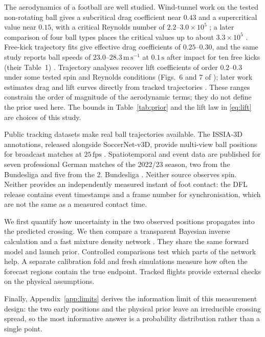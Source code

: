 \documentclass[11pt,a4paper]{article}
\begin{document}
The aerodynamics of a football are well studied. Wind-tunnel work on the tested non-rotating ball gives a subcritical drag coefficient near $0.43$ and a supercritical value near $0.15$, with a critical Reynolds number of $2.2$--$3.0\times10^5$ \cite{asai2007}; a later comparison of four ball types places the critical values up to about $3.3\times10^5$ \cite{asai2013}. Free-kick trajectory fits give effective drag coefficients of $0.25$--$0.30$, and the same study reports ball speeds of $23.0$--$28.3\,\mathrm{m\,s^{-1}}$ at $0.1\,\mathrm{s}$ after impact for ten free kicks (their Table~1) \cite{bray2003}. Trajectory analyses recover lift coefficients of order $0.2$--$0.3$ under some tested spin and Reynolds conditions (Figs.~6 and 7 of \cite{goff2010}); later work estimates drag and lift curves directly from tracked trajectories \cite{goff2017}. These ranges constrain the order of magnitude of the aerodynamic terms; they do not define the prior used here. The bounds in Table~\ref{tab:prior} and the lift law in \eqref{eq:lift} are choices of this study.

Public tracking datasets make real ball trajectories available. The ISSIA-3D annotations, released alongside SoccerNet-v3D, provide multi-view ball positions for broadcast matches at $25\,\mathrm{fps}$ \cite{soccernetv3d,issia}. Spatiotemporal and event data are published for seven professional German matches of the 2022/23 season, two from the Bundesliga and five from the 2. Bundesliga \cite{dfl2025}. Neither source observes spin. Neither provides an independently measured instant of foot contact: the DFL release contains event timestamps and a frame number for synchronisation, which are not the same as a measured contact time.

We first quantify how uncertainty in the two observed positions propagates into the predicted crossing. We then compare a transparent Bayesian inverse calculation and a fast mixture density network \cite{bishop1994}. They share the same forward model and launch prior. Controlled comparisons test which parts of the network help. A separate calibration fold and fresh simulations measure how often the forecast regions contain the true endpoint. Tracked flights provide external checks on the physical assumptions.

Finally, Appendix~\ref{app:limits} derives the information limit of this measurement design: the two early positions and the physical prior leave an irreducible crossing spread, so the most informative answer is a probability distribution rather than a single point.
\end{document}
